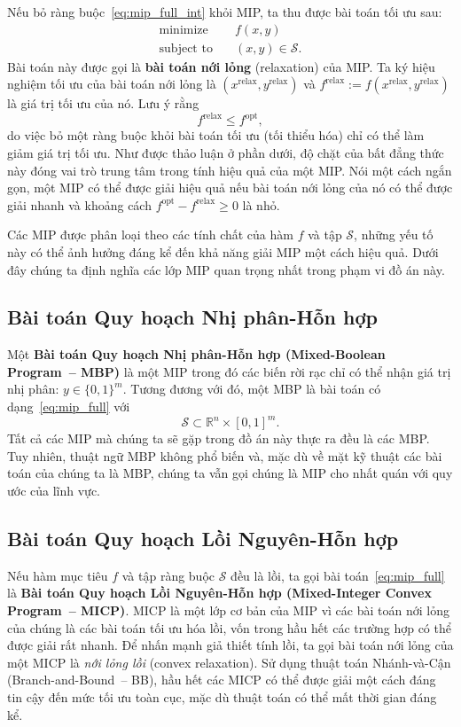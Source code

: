 Nếu bỏ ràng buộc~\eqref{eq:mip_full_int} khỏi MIP, ta thu được bài toán tối ưu sau:
\begin{subequations}
\label{eq:mip_relax}
\begin{align}
\text{minimize} \quad & f(x, y) \\
\text{subject to} \quad & (x, y) \in \mathcal{S}.
\end{align}
\end{subequations}
Bài toán này được gọi là \textbf{bài toán nới lỏng} (relaxation) của MIP.
Ta ký hiệu nghiệm tối ưu của bài toán nới lỏng là $(x^{\text{relax}}, y^{\text{relax}})$
và $f^{\text{relax}} := f(x^{\text{relax}}, y^{\text{relax}})$ là giá trị tối ưu của nó.
Lưu ý rằng
\[
f^{\text{relax}} \leq f^{\text{opt}},
\]
do việc bỏ một ràng buộc khỏi bài toán tối ưu (tối thiểu hóa) chỉ có thể làm giảm giá trị tối ưu.
Như được thảo luận ở phần dưới, độ chặt của bất đẳng thức này đóng vai trò trung tâm trong tính hiệu
quả của một MIP.
Nói một cách ngắn gọn, một MIP có thể được giải hiệu quả nếu bài toán nới lỏng của nó có thể được giải
nhanh và khoảng cách $f^{\text{opt}} - f^{\text{relax}} \geq 0$ là nhỏ.

Các MIP được phân loại theo các tính chất của hàm $f$ và tập $\mathcal{S}$,
những yếu tố này có thể ảnh hưởng đáng kể đến khả năng giải MIP một cách hiệu quả.
Dưới đây chúng ta định nghĩa các lớp MIP quan trọng nhất trong phạm vi đồ án này.

\subsection{Bài toán Quy hoạch Nhị phân-Hỗn hợp}

Một \textbf{Bài toán Quy hoạch Nhị phân-Hỗn hợp (Mixed-Boolean Program~-- MBP)} là một MIP
trong đó các biến rời rạc chỉ có thể nhận giá trị nhị phân: $y \in \{0, 1\}^m$.
Tương đương với đó, một MBP là bài toán có dạng~\eqref{eq:mip_full} với
\[
\mathcal{S} \subset \mathbb{R}^n \times [0, 1]^m.
\]
Tất cả các MIP mà chúng ta sẽ gặp trong đồ án này thực ra đều là các MBP.
Tuy nhiên, thuật ngữ MBP không phổ biến và, mặc dù về mặt kỹ thuật các bài toán của chúng ta là MBP,
chúng ta vẫn gọi chúng là MIP cho nhất quán với quy ước của lĩnh vực.

\subsection{Bài toán Quy hoạch Lồi Nguyên-Hỗn hợp}

Nếu hàm mục tiêu $f$ và tập ràng buộc $\mathcal{S}$ đều là lồi, ta gọi bài toán~\eqref{eq:mip_full}
là \textbf{Bài toán Quy hoạch Lồi Nguyên-Hỗn hợp (Mixed-Integer Convex Program~-- MICP)}.
MICP là một lớp cơ bản của MIP vì các bài toán nới lỏng của chúng là các bài toán tối ưu hóa lồi,
vốn trong hầu hết các trường hợp có thể được giải rất nhanh.
Để nhấn mạnh giả thiết tính lồi, ta gọi bài toán nới lỏng của một MICP là \textit{nới lỏng lồi}
(convex relaxation).
Sử dụng thuật toán Nhánh-và-Cận (Branch-and-Bound~-- BB), hầu hết các MICP có thể được giải một cách
đáng tin cậy đến mức tối ưu toàn cục, mặc dù thuật toán có thể mất thời gian đáng kể.

